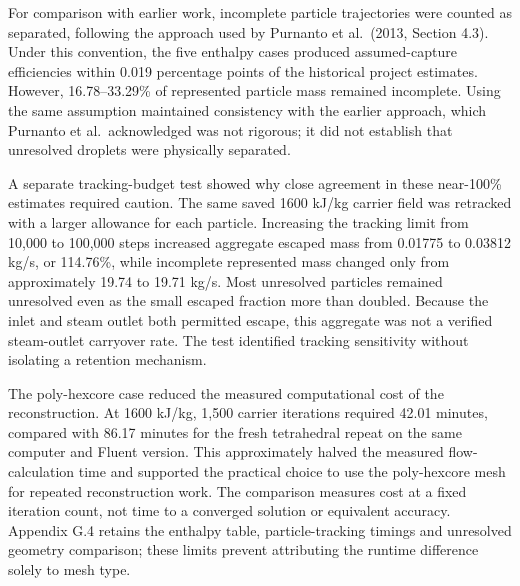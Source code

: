 For comparison with earlier work, incomplete particle trajectories were counted as separated, following the approach used by Purnanto et al.~(2013, Section 4.3). Under this convention, the five enthalpy cases produced assumed-capture efficiencies within 0.019 percentage points of the historical project estimates. However, 16.78--33.29\% of represented particle mass remained incomplete. Using the same assumption maintained consistency with the earlier approach, which Purnanto et al.~acknowledged was not rigorous; it did not establish that unresolved droplets were physically separated.

A separate tracking-budget test showed why close agreement in these near-100\% estimates required caution. The same saved 1600 kJ/kg carrier field was retracked with a larger allowance for each particle. Increasing the tracking limit from 10,000 to 100,000 steps increased aggregate escaped mass from 0.01775 to 0.03812 kg/s, or 114.76\%, while incomplete represented mass changed only from approximately 19.74 to 19.71 kg/s. Most unresolved particles remained unresolved even as the small escaped fraction more than doubled. Because the inlet and steam outlet both permitted escape, this aggregate was not a verified steam-outlet carryover rate. The test identified tracking sensitivity without isolating a retention mechanism.

The poly-hexcore case reduced the measured computational cost of the reconstruction. At 1600 kJ/kg, 1,500 carrier iterations required 42.01 minutes, compared with 86.17 minutes for the fresh tetrahedral repeat on the same computer and Fluent version. This approximately halved the measured flow-calculation time and supported the practical choice to use the poly-hexcore mesh for repeated reconstruction work. The comparison measures cost at a fixed iteration count, not time to a converged solution or equivalent accuracy. Appendix G.4 retains the enthalpy table, particle-tracking timings and unresolved geometry comparison; these limits prevent attributing the runtime difference solely to mesh type.

